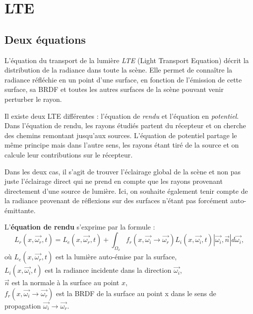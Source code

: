 \chapter{LTE}

\section{Deux équations}

L'équation du transport de la lumière \textit{LTE} (Light Transport Equation) décrit la distribution de la radiance dans toute la scène. Elle permet de connaître la radiance réfléchie en un point d'une surface, en fonction de l'émission de cette surface, sa BRDF et toutes les autres surfaces de la scène pouvant venir perturber le rayon.\newline\par

Il existe deux LTE différentes : l'équation de \textit{rendu} et l'équation en \textit{potentiel}. Dans l'équation de rendu, les rayons étudiés partent du récepteur et on cherche des chemins remontant jusqu'aux sources. L'équation de potentiel partage le même principe mais dans l'autre sens, les rayons étant tiré de la source et on calcule leur contributions sur le récepteur.\par
Dans les deux cas, il s'agit de trouver l'éclairage global de la scène et non pas juste l'éclairage direct qui ne prend en compte que les rayons provenant directement d'une source de lumière. Ici, on souhaite également tenir compte de la radiance provenant de réflexions sur des surfaces n'étant pas forcément auto-émittante.\newline\par

L'\textbf{équation de rendu} s'exprime par la formule :
\large \begin{equation}\label{eq:LTE_rendu}
    L_r(x, \overrightarrow{\omega_r}, t) =
        L_e(x, \overrightarrow{\omega_r}, t) +
        \int_{\Omega_x}
            f_r(x, \overrightarrow{\omega_i} \longrightarrow \overrightarrow{\omega_r})
            L_i(x, \overrightarrow{\omega_i}, t)
            |\overrightarrow{\omega_i}, \overrightarrow{n} |
        d\overrightarrow{\omega_i}
,\end{equation} \normalsize
où $L_e(x, \overrightarrow{\omega_r}, t)$ est la lumière auto-émise par la surface, \\
$L_i(x, \overrightarrow{\omega_i}, t)$ est la radiance incidente dans la direction $\overrightarrow{\omega_i}$, \\
$\overrightarrow{n}$ est la normale à la surface au point $x$, \\
$f_r(x, \overrightarrow{\omega_i} \longrightarrow \overrightarrow{\omega_r})$ est la BRDF de la surface au point x dans le sens de propagation $\overrightarrow{\omega_i} \longrightarrow \overrightarrow{\omega_r}$.\newline\par


